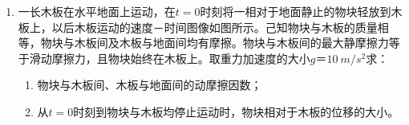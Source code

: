 \begin{enumerate}[leftmargin=0em]
\begin{enumerate}
\end{enumerate}


\item 
{}
一长木板在水平地面上运动，在$ t=0 $时刻将一相对于地面静止的物块轻放到木板上，以后木板运动的速度－时间图像如图所示。己知物块与木板的质量相等，物块与木板间及木板与地面间均有摩擦。物块与木板间的最大静摩擦力等于滑动摩擦力，且物块始终在木板上。取重力加速度的大小$ g ＝ 10 \ m/s^{2} $求：
\begin{enumerate}
\renewcommand{\labelenumii}{(\arabic{enumii})}

\item 
物块与木板间、木板与地面间的动摩擦因数；

\item 
从$ t=0 $时刻到物块与木板均停止运动时，物块相对于木板的位移的大小。

\end{enumerate}
\begin{figure}[h!]
\flushright 

\end{figure}



\end{enumerate}
